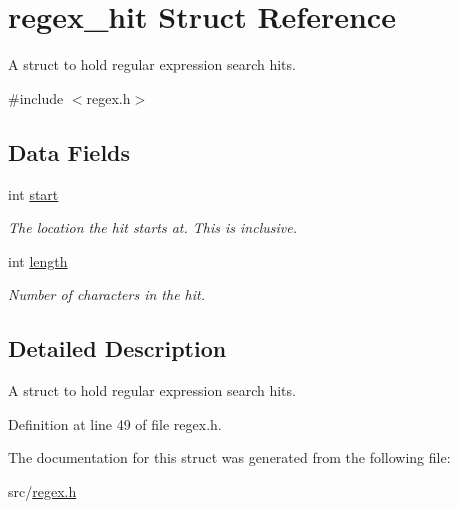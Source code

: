 \hypertarget{structregex__hit}{\section{regex\-\_\-hit \-Struct \-Reference}
\label{structregex__hit}
}


\-A struct to hold regular expression search hits.  




{\ttfamily \#include $<$regex.\-h$>$}

\subsection*{\-Data \-Fields}
\begin{DoxyCompactItemize}
\item 
\hypertarget{structregex__hit_a37722a150250e2a5a98e5e0d11e53449}{int \hyperlink{structregex__hit_a37722a150250e2a5a98e5e0d11e53449}{start}}\label{structregex__hit_a37722a150250e2a5a98e5e0d11e53449}

\begin{DoxyCompactList}\small\item\em \-The location the hit starts at. \-This is inclusive. \end{DoxyCompactList}\item 
\hypertarget{structregex__hit_a9f59b34b1f25fe00023291b678246bcc}{int \hyperlink{structregex__hit_a9f59b34b1f25fe00023291b678246bcc}{length}}\label{structregex__hit_a9f59b34b1f25fe00023291b678246bcc}

\begin{DoxyCompactList}\small\item\em \-Number of characters in the hit. \end{DoxyCompactList}\end{DoxyCompactItemize}


\subsection{\-Detailed \-Description}
\-A struct to hold regular expression search hits. 

\-Definition at line 49 of file regex.\-h.



\-The documentation for this struct was generated from the following file\-:\begin{DoxyCompactItemize}
\item 
src/\hyperlink{regex_8h}{regex.\-h}\end{DoxyCompactItemize}
